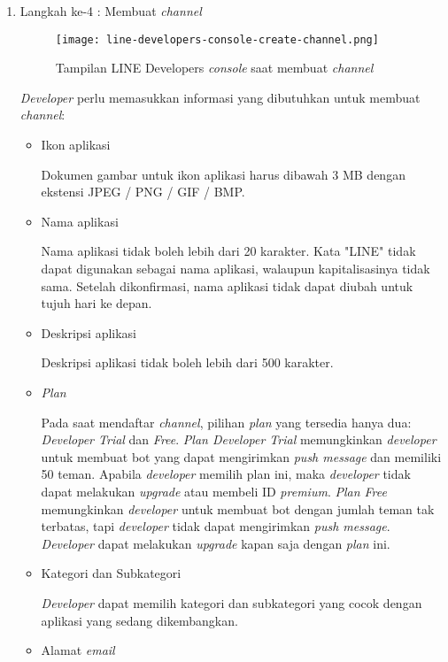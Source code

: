 \begin{enumerate}
\item Langkah ke-4 : Membuat \textit{channel}
\begin{figure}[H]
	\centering  
	\texttt{[image: line-developers-console-create-channel.png]}  
	\caption[Tampilan LINE Developers \textit{console} saat membuat \textit{channel}]{Tampilan LINE Developers \textit{console} saat membuat \textit{channel}} 
	\label{fig:line-developers-console-create-channel} 
\end{figure}

\textit{Developer} perlu memasukkan informasi yang dibutuhkan untuk membuat \textit{channel}:
\begin{itemize}
\item Ikon aplikasi

Dokumen gambar untuk ikon aplikasi harus dibawah 3 MB dengan ekstensi JPEG / PNG / GIF / BMP.

\item Nama aplikasi

Nama aplikasi tidak boleh lebih dari 20 karakter. Kata "LINE" tidak dapat digunakan sebagai nama aplikasi, walaupun kapitalisasinya tidak sama. Setelah dikonfirmasi, nama aplikasi tidak dapat diubah untuk tujuh hari ke depan.

\item Deskripsi aplikasi

Deskripsi aplikasi tidak boleh lebih dari 500 karakter.

\item \textit{Plan}

Pada saat mendaftar \textit{channel}, pilihan \textit{plan} yang tersedia hanya dua: \textit{Developer Trial} dan \textit{Free}. \textit{Plan Developer Trial} memungkinkan \textit{developer} untuk membuat bot yang dapat mengirimkan \textit{push message} dan memiliki 50 teman. Apabila \textit{developer} memilih plan ini, maka \textit{developer} tidak dapat melakukan \textit{upgrade} atau membeli ID \textit{premium}. \textit{Plan Free} memungkinkan \textit{developer} untuk membuat bot dengan jumlah teman tak terbatas, tapi \textit{developer} tidak dapat mengirimkan \textit{push message}. \textit{Developer} dapat melakukan \textit{upgrade} kapan saja dengan \textit{plan} ini.

\item Kategori dan Subkategori

\textit{Developer} dapat memilih kategori dan subkategori yang cocok dengan aplikasi yang sedang dikembangkan.

\item Alamat \textit{email}


\end{itemize}
\end{enumerate}
